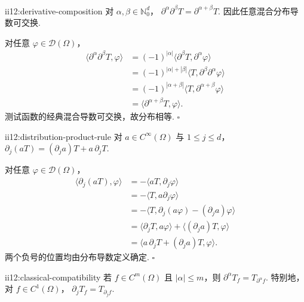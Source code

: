 \begin{FAProposition}[B][分布导数的复合与混合导数交换]{ii12:derivative-composition}
对 \(\displaystyle\alpha,\beta\in\mathbb N_0^d\)， \(\displaystyle \partial^\alpha\partial^\beta T = \partial^{\alpha+\beta}T.\)
因此任意混合分布导数可交换.
\end{FAProposition}

\begin{FAProof}
对任意 \(\displaystyle\varphi\in\mathcal D(\Omega)\)，
\[
\begin{aligned}
\langle\partial^\alpha\partial^\beta T,\varphi\rangle
&=
(-1)^{|\alpha|}\langle\partial^\beta T,\partial^\alpha\varphi\rangle\\
&=
(-1)^{|\alpha|+|\beta|}\langle T,\partial^\beta\partial^\alpha\varphi\rangle\\
&=
(-1)^{|\alpha+\beta|}\langle T,\partial^{\alpha+\beta}\varphi\rangle\\
&=
\langle\partial^{\alpha+\beta}T,\varphi\rangle.
\end{aligned}
\]
测试函数的经典混合导数可交换，故分布相等.
\hfill\(\square\)
\end{FAProof}

\begin{FAProposition}[B][光滑乘子的分布乘积法则]{ii12:distribution-product-rule}
对 \(\displaystyle a\in C^\infty(\Omega)\) 与 \(\displaystyle1\leqslant j\leqslant d\)， \(\displaystyle \partial_j(aT) = (\partial_ja)T+a\,\partial_jT.\)
\end{FAProposition}

\begin{FAProof}
对任意 \(\displaystyle\varphi\in\mathcal D(\Omega)\)，
\[
\begin{aligned}
\langle\partial_j(aT),\varphi\rangle
&=-\langle aT,\partial_j\varphi\rangle\\
&=-\langle T,a\partial_j\varphi\rangle\\
&=-\langle T,\partial_j(a\varphi)-(\partial_ja)\varphi\rangle\\
&=\langle\partial_jT,a\varphi\rangle+\langle(\partial_ja)T,\varphi\rangle\\
&=\langle a\,\partial_jT+(\partial_ja)T,\varphi\rangle.
\end{aligned}
\]
两个负号的位置均由分布导数定义确定.
\hfill\(\square\)
\end{FAProof}

\begin{FATheorem}[B][经典导数与分布导数相容]{ii12:classical-compatibility}
若 \(\displaystyle f\in C^m(\Omega)\) 且 \(\displaystyle|\alpha|\leqslant m\)，则 \(\displaystyle \partial^\alpha T_f=T_{\partial^\alpha f}.\)
特别地，对 \(\displaystyle f\in C^1(\Omega)\)， \(\displaystyle \partial_jT_f=T_{\partial_jf}.\)
\end{FATheorem}

